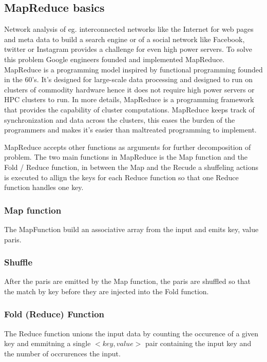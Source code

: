 \documentclass{article}
\begin{document}
\subsection{MapReduce basics}
Network analysis of eg. interconnected networks like the Internet for web pages and meta data to build a search engine or of a social network like Facebook, twitter or Instagram provides a challenge for even high power servers. To solve this problem Google engineers founded and implemented MapReduce. MapReduce is a programming model inspired by functional programming founded in the 60's. It's designed for large-scale data processing and designed to run on clusters of commodity hardware hence it does not require high power servers or HPC clusters to run.
In more details, MapReduce is a programming framework that provides the capability of cluster computations. MapReduce keeps track of synchronization and data across the clusters, this eases the burden of the programmers and makes it's easier than maltreated programming to implement.

\noindent MapReduce accepts other functions as arguments for further decomposition of problem. The two main functions in MapReduce is the Map function and the Fold / Reduce function, in between the Map and the Recude a shuffeling actions is executed to allign the keys for each Reduce function so that one Reduce function handles one key.



\subsubsection{Map function}
The MapFunction build an associative array from the input and emits key, value paris.



\subsubsection{Shuffle}
After the paris are emitted by the Map function, the paris are shuffled so that the match by key before they are injected into the Fold function.


\subsubsection{Fold (Reduce) Function}
The Reduce function unions the input data by counting the occurence of a given key and emmitning a single $<key,value>$ pair containing the input key and the number of occrurences the input.
\end{document}
